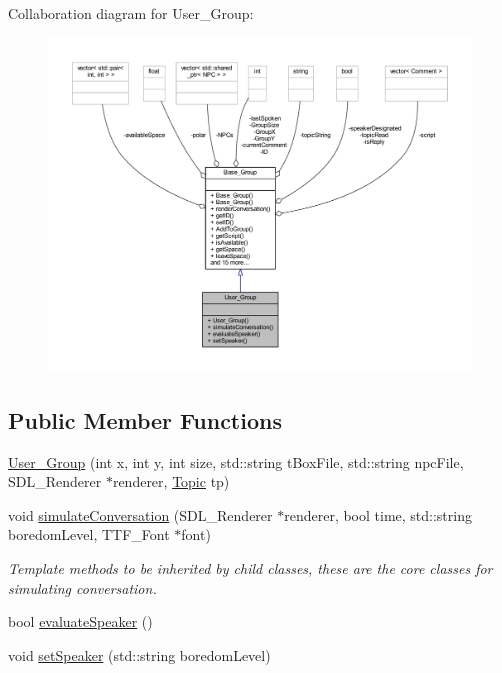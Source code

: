 Collaboration diagram for User\+\_\+\+Group\+:\nopagebreak
\begin{figure}[H]
\begin{center}
\leavevmode
\includegraphics[width=350pt]{class_user___group__coll__graph}
\end{center}
\end{figure}
\subsection*{Public Member Functions}
\begin{DoxyCompactItemize}
\item 
\hyperlink{class_user___group_a553bb5b748ef79772fe5cecedc2154be}{User\+\_\+\+Group} (int x, int y, int size, std\+::string t\+Box\+File, std\+::string npc\+File, S\+D\+L\+\_\+\+Renderer $\ast$renderer, \hyperlink{class_topic}{Topic} tp)
\item 
void \hyperlink{class_user___group_a0142ca8121ea4bb4d881153e48e486f9}{simulate\+Conversation} (S\+D\+L\+\_\+\+Renderer $\ast$renderer, bool time, std\+::string boredom\+Level, T\+T\+F\+\_\+\+Font $\ast$font)
\begin{DoxyCompactList}\small\item\em Template methods to be inherited by child classes, these are the core classes for simulating conversation. \end{DoxyCompactList}\item 
bool \hyperlink{class_user___group_a40051b822a0f0dd126b95d0f0fd28eff}{evaluate\+Speaker} ()
\item 
void \hyperlink{class_user___group_aeb67757a4645ae32ea0b9c426fece2de}{set\+Speaker} (std\+::string boredom\+Level)
\end{DoxyCompactItemize}



